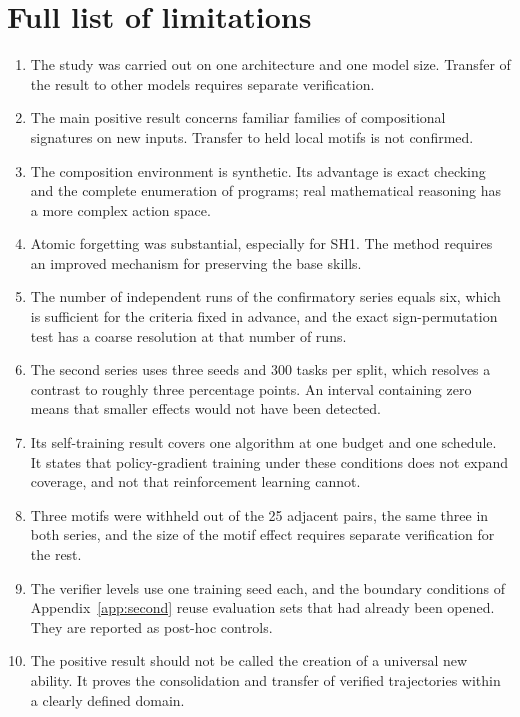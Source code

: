 \documentclass{zapiski}
\begin{document}
\section{Full list of limitations}
\label{app:limits}

\begin{enumerate}
\item The study was carried out on one architecture and one model size. Transfer of
the result to other models requires separate verification.
\item The main positive result concerns familiar families of compositional
signatures on new inputs. Transfer to held local motifs is not confirmed.
\item The composition environment is synthetic. Its advantage is exact checking and
the complete enumeration of programs; real mathematical reasoning has a more complex
action space.
\item Atomic forgetting was substantial, especially for SH1. The method requires an
improved mechanism for preserving the base skills.
\item The number of independent runs of the confirmatory series equals six, which is
sufficient for the criteria fixed in advance, and the exact sign-permutation test has
a coarse resolution at that number of runs.
\item The second series uses three seeds and 300 tasks per split, which resolves a
contrast to roughly three percentage points. An interval containing zero means that
smaller effects would not have been detected.
\item Its self-training result covers one algorithm at one budget and one schedule.
It states that policy-gradient training under these conditions does not expand
coverage, and not that reinforcement learning cannot.
\item Three motifs were withheld out of the 25 adjacent pairs, the same three in both
series, and the size of the motif effect requires separate verification for the rest.
\item The verifier levels use one training seed each, and the boundary conditions of
Appendix~\ref{app:second} reuse evaluation sets that had already been opened. They
are reported as post-hoc controls.
\item The positive result should not be called the creation of a universal new
ability. It proves the consolidation and transfer of verified trajectories within a
clearly defined domain.
\end{enumerate}
\end{document}
